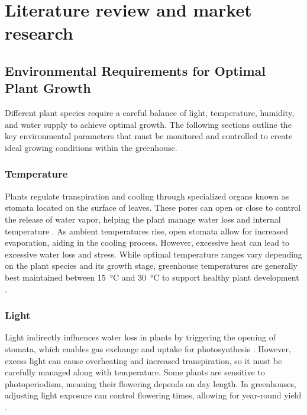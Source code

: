 \chapter{Literature review and market research}\label{chap:lit}

\section{Environmental Requirements for Optimal Plant Growth }

Different plant species require a careful balance of light, temperature, humidity, and water supply to achieve optimal growth. The following sections outline the key environmental parameters that must be monitored and controlled to create ideal growing conditions within the greenhouse.

\subsection{Temperature} 

Plants regulate transpiration and cooling through specialized organs known as stomata located on the surface of leaves. These pores can open or close to control the release of water vapor, helping the plant manage water loss and internal temperature \cite{xu2024_high_temp_stomatal}. As ambient temperatures rise, open stomata allow for increased evaporation, aiding in the cooling process. However, excessive heat can lead to excessive water loss and stress. While optimal temperature ranges vary depending on the plant species and its growth stage, greenhouse temperatures are generally best maintained between \SI{15}{\degreeCelsius} and \SI{30}{\degreeCelsius} to support healthy plant development \cite{kosan2020}.

\subsection{Light} 

Light indirectly influences water loss in plants by triggering the opening of stomata, which enables gas exchange and  uptake for photosynthesis \cite{kochetova2022}. However, excess light can cause overheating and increased transpiration, so it must be carefully managed along with temperature. Some plants are sensitive to photoperiodism, meaning their flowering depends on day length. In greenhouses, adjusting light exposure can control flowering times, allowing for year-round yield \cite{greenhouse_lighting}.

